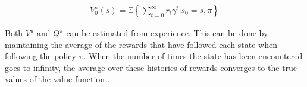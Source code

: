 \begin{align}
\label{equation:v_infinite}
V_{0}^\pi(s) = \mathbb{E} \left\{\left. \sum_{t=0}^\infty r_{t}\gamma^t \right\vert s_0 = s,\pi \right\}
\end{align}

Both $V^\pi$ and $Q^\pi$ can be estimated from experience. This can be done by
maintaining the average of the rewards that have followed each state when
following the policy $\pi$. When the number of times the state has been
encountered goes to infinity, the average over these histories of rewards
converges to the true values of the value function
\parencite{barto1998reinforcement}.




